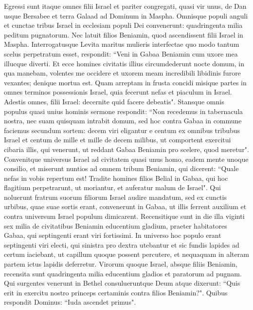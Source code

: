 \begin{biblechapter}  
\verse Egressi sunt itaque omnes filii Israel et pariter congregati, quasi vir unus, de Dan usque Bersabee et terra Galaad ad Dominum in Maspha. 
\verse Omnisque populi anguli et cunctae tribus Israel in ecclesiam populi Dei convenerunt: quadringenta milia peditum pugnatorum. 
\verse Nec latuit filios Beniamin, quod ascendissent filii Israel in Maspha. Interrogatusque Levita maritus mulieris interfectae quo modo tantum scelus perpetratum esset, 
\verse respondit: “Veni in Gabaa Beniamin cum uxore mea illucque diverti. 
\verse Et ecce homines civitatis illius circumdederunt nocte domum, in qua manebam, volentes me occidere et uxorem meam incredibili libidinis furore vexantes; denique mortua est. 
\verse Quam arreptam in frusta concidi misique partes in omnes terminos possessionis Israel, quia fecerunt nefas et piaculum in Israel. 
\verse Adestis omnes, filii Israel: decernite quid facere debeatis". 
\verse Stansque omnis populus quasi unius hominis sermone respondit: “Non recedemus in tabernacula nostra, nec suam quisquam intrabit domum, 
\verse sed hoc contra Gabaa in commune faciemus secundum sortem: 
\verse decem viri eligantur e centum ex omnibus tribubus Israel et centum de mille et mille de decem milibus, ut comportent exercitui cibaria illis, qui venerunt, ut reddant Gabaa Beniamin pro scelere, quod meretur". 
\verse Convenitque universus Israel ad civitatem quasi unus homo, eadem mente unoque consilio, 
\verse et miserunt nuntios ad omnem tribum Beniamin, qui dicerent: “Quale nefas in vobis repertum est! 
\verse Tradite homines filios Belial in Gabaa, qui hoc flagitium perpetrarunt, ut moriantur, et auferatur malum de Israel". Qui noluerunt fratrum suorum filiorum Israel audire mandatum, 
\verse sed ex cunctis urbibus, quae suae sortis erant, convenerunt in Gabaa, ut illis ferrent auxilium et contra universum Israel populum dimicarent. 
\verse Recensitique sunt in die illa viginti sex milia de civitatibus Beniamin educentium gladium, praeter habitatores Gabaa, qui septingenti erant viri fortissimi. 
\verse In universo hoc populo erant septingenti viri electi, qui sinistra pro dextra utebantur et sic fundis lapides ad certum iaciebant, ut capillum quoque possent percutere, et nequaquam in alteram partem ictus lapidis deferretur. 
\verse Virorum quoque Israel, absque filiis Beniamin, recensita sunt quadringenta milia educentium gladios et paratorum ad pugnam. 
\verse Qui surgentes venerunt in Bethel consulueruntque Deum atque dixerunt: “Quis erit in exercitu nostro princeps certaminis contra filios Beniamin?". Quibus respondit Dominus: “Iuda ascendet primus". 

\end{biblechapter}
